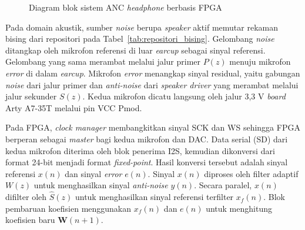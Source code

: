 \begin{figure}[H]
{%
  }
  \caption{Diagram blok sistem ANC \emph{headphone} berbasis FPGA}
  \label{fig:diagram_blok}
\end{figure}

Pada domain akustik, sumber \emph{noise} berupa \emph{speaker} aktif memutar rekaman bising dari repositori pada Tabel~\ref{tab:repositori_bising}. Gelombang \emph{noise} ditangkap oleh mikrofon referensi di luar \emph{earcup} sebagai sinyal referensi. Gelombang yang sama merambat melalui jalur primer $P(z)$ menuju mikrofon \emph{error} di dalam \emph{earcup}. Mikrofon \emph{error} menangkap sinyal residual, yaitu gabungan \emph{noise} dari jalur primer dan \emph{anti-noise} dari \emph{speaker driver} yang merambat melalui jalur sekunder $S(z)$. Kedua mikrofon dicatu langsung oleh jalur 3,3 V \emph{board} Arty A7-35T melalui pin VCC Pmod.

Pada FPGA, \emph{clock manager} membangkitkan sinyal SCK dan WS sehingga FPGA berperan sebagai \emph{master} bagi kedua mikrofon dan DAC. Data serial (SD) dari kedua mikrofon diterima oleh blok penerima I2S, kemudian dikonversi dari format 24-bit menjadi format \emph{fixed-point}. Hasil konversi tersebut adalah sinyal referensi $x(n)$ dan sinyal \emph{error} $e(n)$. Sinyal $x(n)$ diproses oleh filter adaptif $W(z)$ untuk menghasilkan sinyal \emph{anti-noise} $y(n)$. Secara paralel, $x(n)$ difilter oleh $\hat{S}(z)$ untuk menghasilkan sinyal referensi terfilter $x_f(n)$. Blok pembaruan koefisien menggunakan $x_f(n)$ dan $e(n)$ untuk menghitung koefisien baru $\mathbf{W}(n+1)$.


